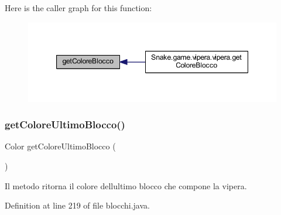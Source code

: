 Here is the caller graph for this function\+:
\nopagebreak
\begin{figure}[H]
\begin{center}
\leavevmode
\includegraphics[width=347pt]{class_snake_1_1game_1_1vipera_1_1blocchi_a6c5d6f8c561308ff9ec579b370a969e0_icgraph}
\end{center}
\end{figure}
\mbox{\label{class_snake_1_1game_1_1vipera_1_1blocchi_a1afbc9b85396f53e6180eab2e5a36d4d}} 
\subsubsection{\texorpdfstring{get\+Colore\+Ultimo\+Blocco()}{getColoreUltimoBlocco()}}
{\footnotesize\ttfamily Color get\+Colore\+Ultimo\+Blocco (\begin{DoxyParamCaption}{ }\end{DoxyParamCaption})}



Il metodo ritorna il colore dell\textquotesingle{}ultimo blocco che compone la vipera. 



Definition at line 219 of file blocchi.\+java.


